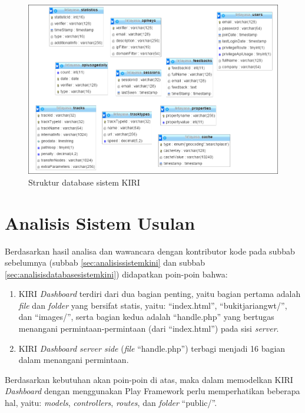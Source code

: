 \begin{figure}[htbp]
	\centering
		\includegraphics[scale=0.65]{Gambar/4_strukturdatabase.PNG}
	\caption{Struktur database sistem KIRI}
	\label{fig:4_strukturdatabase}
\end{figure}


\section{Analisis Sistem Usulan}
\label{sec:analisissistemusulan}
Berdasarkan hasil analisa dan wawancara dengan kontributor kode pada subbab sebelumnya (subbab \ref{sec:analisissistemkini} dan subbab \ref{sec:analisisdatabasesistemkini}) didapatkan poin-poin bahwa:
\begin{enumerate}
	\item KIRI \textit{Dashboard} terdiri dari dua bagian penting, yaitu bagian pertama adalah \textit{file} dan \textit{folder} yang bersifat statis, yaitu: ``index.html'', ``bukitjariangwt/'', dan ``images/'', serta bagian kedua adalah ``handle.php'' yang bertugas menangani permintaan-permintaan (dari ``index.html'') pada sisi \textit{server}.
	\item KIRI \textit{Dashboard server side} (\textit{file} ``handle.php'') terbagi menjadi 16 bagian dalam menangani permintaan.
\end{enumerate}

Berdasarkan kebutuhan akan poin-poin di atas, maka dalam memodelkan KIRI \textit{Dashboard} dengan menggunakan Play Framework perlu memperhatikan beberapa hal, yaitu: \textit{models}, \textit{controllers}, \textit{routes}, dan \textit{folder} ``public/''.

